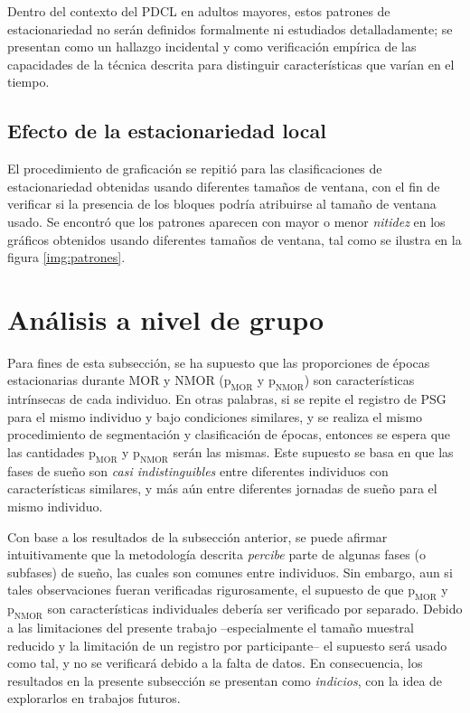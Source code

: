\documentclass[12pt,letterpaper]{book}
\begin{document}
Dentro del contexto del PDCL en adultos mayores, estos patrones de estacionariedad no serán definidos formalmente ni estudiados detalladamente; se presentan como un hallazgo incidental y como verificación empírica de las capacidades de la técnica descrita para distinguir características que varían en el tiempo.
%

\subsection*{Efecto de la estacionariedad local}

El procedimiento de graficación se repitió para las clasificaciones de estacionariedad obtenidas usando diferentes tamaños de ventana, con el fin de verificar si la presencia de los bloques podría atribuirse al tamaño de ventana usado.
%
Se encontró que los patrones aparecen con mayor o menor \textit{nitidez} en los gráficos obtenidos usando diferentes tamaños de ventana, tal como se ilustra en la figura \ref{img:patrones}.


\section{Análisis a nivel de grupo}

Para fines de esta subsección, se ha supuesto que las proporciones de épocas estacionarias durante MOR y NMOR ($\text{p}_{\text{MOR}}$ y $\text{p}_{\text{NMOR}}$) son características intrínsecas de cada individuo. 
%
En otras palabras, si se repite el registro de PSG para el mismo individuo y bajo condiciones similares, y se realiza el mismo procedimiento de segmentación y clasificación de épocas, entonces se espera que las cantidades $\text{p}_{\text{MOR}}$ y $\text{p}_{\text{NMOR}}$ serán las mismas.
%
Este supuesto se basa en que las fases de sueño son \textit{casi indistinguibles} entre diferentes individuos con características similares, y más aún entre diferentes jornadas de sueño para el mismo individuo.

Con base a los resultados de la subsección anterior, se puede afirmar intuitivamente que la metodología descrita \textit{percibe} parte de algunas fases (o subfases) de sueño, las cuales son comunes entre individuos.
%
Sin embargo, aun si tales observaciones fueran verificadas rigurosamente, el supuesto de que $\text{p}_{\text{MOR}}$ y $\text{p}_{\text{NMOR}}$ son características individuales debería ser verificado por separado.
%
Debido a las limitaciones del presente trabajo --especialmente el tamaño muestral reducido y la limitación de un registro por participante-- el supuesto será usado como tal, y no se verificará debido a la falta de datos.
%
En consecuencia, los resultados en la presente subsección se presentan como \textit{indicios}, con la idea de explorarlos en trabajos futuros.
\end{document}
